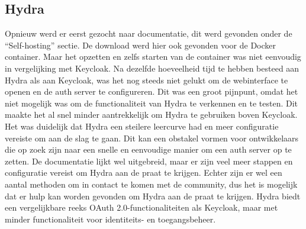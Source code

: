 \subsection{Hydra}%
\label{subsec:hydra}
Opnieuw werd er eerst gezocht naar documentatie, dit werd gevonden onder de ``Self-hosting'' sectie. De download werd hier ook gevonden voor de Docker container.
Maar het opzetten en zelfs starten van de container was niet eenvoudig in vergelijking met Keycloak. Na dezelfde hoeveelheid tijd te hebben besteed aan Hydra als aan Keycloak, was het nog steeds niet gelukt om de webinterface te openen en de auth server te configureren. 
Dit was een groot pijnpunt, omdat het niet mogelijk was om de functionaliteit van Hydra te verkennen en te testen. Dit maakte het al snel minder aantrekkelijk om Hydra te gebruiken boven Keycloak. Het was duidelijk dat Hydra een steilere leercurve had en meer configuratie vereiste om aan de slag te gaan. Dit kan een obstakel vormen voor ontwikkelaars die op zoek zijn naar een snelle en eenvoudige manier om een auth server op te zetten.
De documentatie lijkt wel uitgebreid, maar er zijn veel meer stappen en configuratie vereist om Hydra aan de praat te krijgen. 
Echter zijn er wel een aantal methoden om in contact te komen met de community, dus het is mogelijk dat er hulp kan worden gevonden om Hydra aan de praat te krijgen.
\newline
Hydra biedt een vergelijkbare reeks OAuth 2.0-functionaliteiten als Keycloak, maar met minder functionaliteit voor identiteits- en toegangsbeheer.
